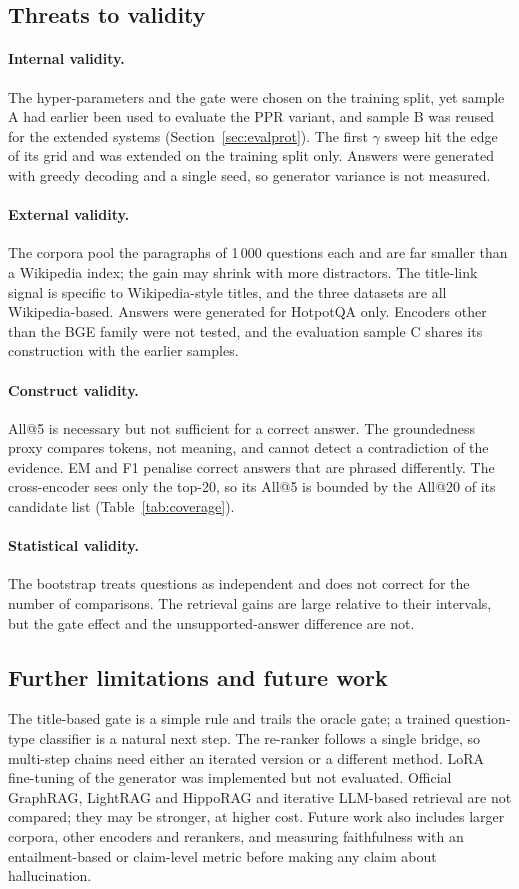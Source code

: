 \documentclass[a4paper,fleqn]{cas-sc}
\begin{document}
\subsection{Threats to validity}
\paragraph{Internal validity.} The hyper-parameters and the gate were chosen on the training split, yet sample A had earlier been used to evaluate the PPR variant, and sample B was reused for the extended systems (Section~\ref{sec:evalprot}). The first $\gamma$ sweep hit the edge of its grid and was extended on the training split only. Answers were generated with greedy decoding and a single seed, so generator variance is not measured.
\paragraph{External validity.} The corpora pool the paragraphs of 1\,000 questions each and are far smaller than a Wikipedia index; the gain may shrink with more distractors. The title-link signal is specific to Wikipedia-style titles, and the three datasets are all Wikipedia-based. Answers were generated for HotpotQA only. Encoders other than the BGE family were not tested, and the evaluation sample C shares its construction with the earlier samples.
\paragraph{Construct validity.} All@5 is necessary but not sufficient for a correct answer. The groundedness proxy compares tokens, not meaning, and cannot detect a contradiction of the evidence. EM and F1 penalise correct answers that are phrased differently. The cross-encoder sees only the top-20, so its All@5 is bounded by the All@20 of its candidate list (Table~\ref{tab:coverage}).
\paragraph{Statistical validity.} The bootstrap treats questions as independent and does not correct for the number of comparisons. The retrieval gains are large relative to their intervals, but the gate effect and the unsupported-answer difference are not.

\subsection{Further limitations and future work}
The title-based gate is a simple rule and trails the oracle gate; a trained question-type classifier is a natural next step. The re-ranker follows a single bridge, so multi-step chains need either an iterated version or a different method. LoRA fine-tuning of the generator \citep{hu2022lora,dettmers2023qlora} was implemented but not evaluated. Official GraphRAG, LightRAG and HippoRAG and iterative LLM-based retrieval are not compared; they may be stronger, at higher cost. Future work also includes larger corpora, other encoders and rerankers, and measuring faithfulness with an entailment-based or claim-level metric \citep{honovich2022true,min2023factscore,es2024ragas} before making any claim about hallucination.
\end{document}
